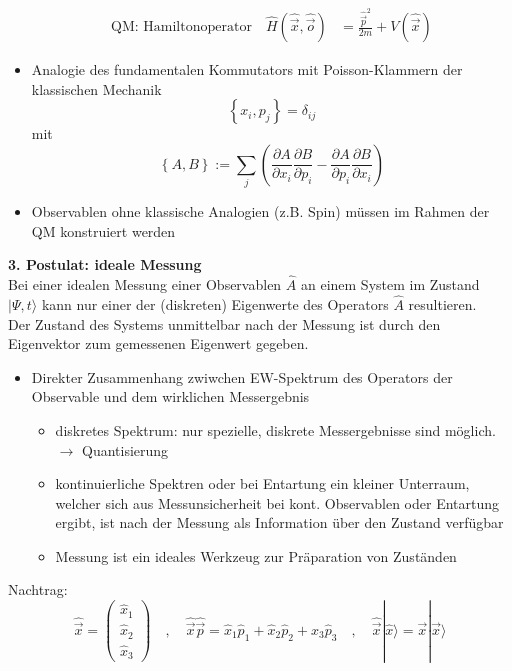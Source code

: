 \documentclass[10pt,article,colorback,accentcolor=tud9d]{scrartcl}
\begin{document}
\begin{fleqn}
\begin{itemize}
\begin{equation}
\begin{aligned}
          \text{QM: Hamiltonoperator} \quad \hat{H}(\hat{\vec{x}},\hat{\vec{o}})&=\frac{\hat{\vec{p}}^2}{2m}+V(\hat{\vec{x}})
        \end{aligned}
        \end{equation}
      \item Analogie des fundamentalen Kommutators mit Poisson-Klammern der klassischen Mechanik
        \begin{equation}
         \left\{x_i,p_j\right\}=\delta_{ij}
        \end{equation}
        mit 
        \begin{equation}
        \left\{A,B\right\}:=\sum_j\left(\frac{\partial A}{\partial x_i}\frac{\partial B}{\partial p_i}-\frac{\partial A}{\partial p_i}\frac{\partial B}{\partial x_i}\right)
        \end{equation}
      \item Observablen ohne klassische Analogien (z.B. Spin) müssen im Rahmen der QM konstruiert werden
    \end{itemize}
  \textbf{3. Postulat: ideale Messung}\\
    Bei einer idealen Messung einer Observablen $\hat{A}$ an einem System im Zustand $\left.\right|\Psi,t\rangle$ kann nur einer der (diskreten) Eigenwerte des Operators $\hat{A}$ resultieren.\\
    Der Zustand des Systems unmittelbar nach der Messung ist durch den Eigenvektor zum gemessenen Eigenwert gegeben.
    \begin{itemize}
      \item Direkter Zusammenhang zwiwchen EW-Spektrum des Operators der Observable und dem wirklichen Messergebnis
        \begin{itemize}
          \item diskretes Spektrum: nur spezielle, diskrete Messergebnisse sind möglich. $\rightarrow$ Quantisierung
          \item kontinuierliche Spektren oder bei Entartung ein kleiner Unterraum, welcher sich aus Messunsicherheit bei kont. Observablen oder Entartung ergibt, ist nach der Messung als Information über den Zustand verfügbar
          \item Messung ist ein ideales Werkzeug zur Präparation von Zuständen
        \end{itemize}
    \end{itemize}
    Nachtrag: 
    \begin{equation}
      \hat{\vec{x}}=\left(\begin{array}{c} \hat{x}_1 \\ \hat{x}_2 \\ \hat{x}_3 \end{array}\right) \quad, \quad \hat{\vec{x}}\hat{\vec{p}}=\hat{x}_1\hat{p}_1 + \hat{x}_2\hat{p}_2 + \hat{x}_3\hat{p}_3 \quad, \quad \hat{\vec{x}}\left.\right|\hat{x}\rangle=\vec{x}\left.\right|\vec{x}\rangle

\end{equation}
\end{fleqn}
\end{document}
